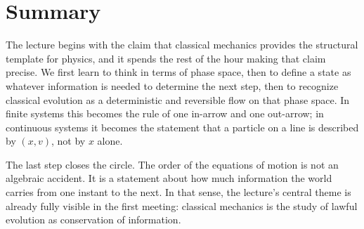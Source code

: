\section{Summary}

The lecture begins with the claim that classical mechanics provides the structural template for physics, and it spends the rest of the hour making that claim precise. We first learn to think in terms of phase space, then to define a state as whatever information is needed to determine the next step, then to recognize classical evolution as a deterministic and reversible flow on that phase space. In finite systems this becomes the rule of one in-arrow and one out-arrow; in continuous systems it becomes the statement that a particle on a line is described by \((x,v)\), not by \(x\) alone.

The last step closes the circle. The order of the equations of motion is not an algebraic accident. It is a statement about how much information the world carries from one instant to the next. In that sense, the lecture's central theme is already fully visible in the first meeting: classical mechanics is the study of lawful evolution as conservation of information.
